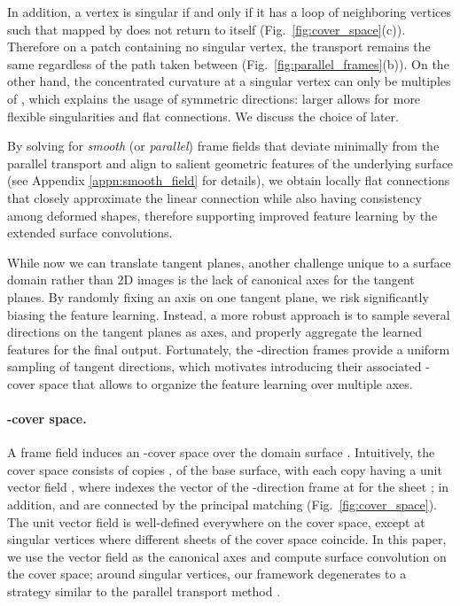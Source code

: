 \documentclass[10pt,twocolumn,letterpaper]{article}
\begin{document}
In addition, a vertex  is singular if and only if it has a loop of neighboring vertices  such that  mapped by  does not return to itself (Fig.~\ref{fig:cover_space}(c)).
Therefore on a patch containing no singular vertex, the transport  remains the same regardless of the path taken between  \cite{Crane:TrivialConnection} (Fig.~\ref{fig:parallel_frames}(b)).
On the other hand, the concentrated curvature at a singular vertex can only be multiples of , which explains the usage of  symmetric directions: larger  allows for more flexible singularities and flat connections.
We discuss the choice of  later.

By solving for \textit{smooth} (or \textit{parallel}) frame fields that deviate minimally from the parallel transport and align to salient geometric features of the underlying surface \cite{Ray:GeometryAware,Crane:TrivialConnection,DirFieldEG2016} (see Appendix \ref{appn:smooth_field} for details), 
we obtain locally flat connections that closely approximate the linear connection while also having consistency among deformed shapes, therefore supporting improved feature learning by the extended surface convolutions.


While now we can translate tangent planes, another challenge unique to a surface domain rather than 2D images is the lack of canonical axes for the tangent planes. 
By randomly fixing an axis on one tangent plane, we risk significantly biasing the feature learning. Instead, a more robust approach is to sample several directions on the tangent planes as axes, and properly aggregate the learned features for the final output.
Fortunately, the -direction frames provide a uniform sampling of tangent directions, which motivates  introducing their associated -cover space that allows to organize the feature learning over multiple axes.

\vspace{-3mm}
\paragraph{-cover space.}
A frame field induces an -cover space over the domain surface \cite{quadcover,dubrovin2012modern}.
Intuitively, the cover space consists of  copies ,  of the base surface, with each copy  having a unit vector field , where  indexes the vector of the -direction frame at  for the sheet ; in addition,  and  are connected by  the principal matching (Fig.~\ref{fig:cover_space}).
The unit vector field is well-defined everywhere on the cover space, except at singular vertices where different sheets of the cover space coincide.
In this paper, we use the vector field as the canonical axes and compute surface convolution on the cover space;
around singular vertices, our framework degenerates to a strategy similar to the parallel transport method \cite{Poulenard:2018:Multidirectional}.
\end{document}
